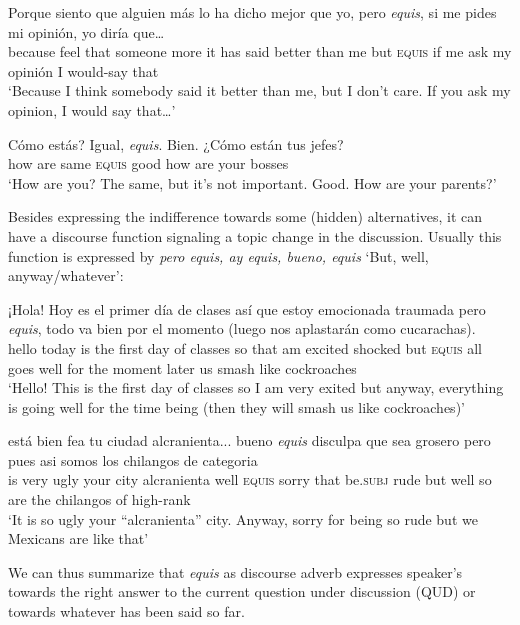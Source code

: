 \documentclass[output=paper
,modfonts
,nonflat]{langsci/langscibook}
\begin{document}
\ea
\gll Porque siento que alguien más lo ha dicho mejor que yo, pero \textit{equis}, si me pides mi opinión, yo diría que…\\
because feel that someone more it has said better than me but \textsc{equis}	if me ask my opinión I would-say that\\
\glt ‘Because I think somebody said it better than me, but I don’t care. If you ask my opinion, I would say that…’
\z

\ea
{}Cómo	estás? Igual, \textit{equis}. Bien. {¿}Cómo están tus jefes?\\
how are same \textsc{equis} good how are your bosses\\
\glt ‘How are you? The same, but it’s not important. Good. How are your parents?’
\z

Besides expressing the indifference towards some (hidden) alternatives, it can have a discourse function signaling a topic change in the discussion. Usually this function is expressed by \textit{pero equis, ay equis, bueno, equis} ‘But, well, anyway/whatever’:

\ea
\gll ¡Hola! Hoy es el primer día de clases así que estoy emocionada traumada pero \textit{equis}, todo va bien por el momento (luego nos aplastarán como cucarachas).\\
hello today is the first day of classes so that am excited shocked but \textsc{equis} all goes well for the moment later us smash like cockroaches\\
\glt ‘Hello! This is the first day of classes so I am very exited but anyway, everything is going well for the time being (then they will smash us like cockroaches)’
\z

\ea
\gll está bien fea tu ciudad alcranienta... bueno \textit{equis} disculpa que sea grosero pero pues asi somos los chilangos de categoria\\
is very ugly your city alcranienta well \textsc{equis} sorry that be.\textsc{subj} rude but well so are the chilangos of high-rank\\
\glt ‘It is so ugly your “alcranienta” city. Anyway, sorry for being so rude but we Mexicans are like that’
\z

We can thus summarize that \textit{equis} as discourse adverb expresses speaker’s towards the right answer to the current question under discussion (QUD) or towards whatever has been said so far.

\end{document}
